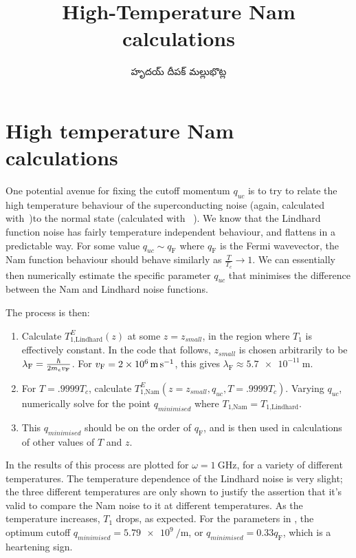 \documentclass[../main.tex]{subfiles}
\title{High-Temperature Nam calculations}
\author{\begin{telugu}హృదయ్ దీపక్ మల్లుభొట్ల\end{telugu}}
\date{}
\begin{document}
	\graphicspath{{\main/figures/}}

	\onlyinsubfile{\maketitle}

	\section{High temperature Nam calculations} \label{sec:htn:intro}

	One potential avenue for fixing the cutoff momentum $q_{uc}$ is to try to relate the high temperature behaviour of the superconducting noise (again, calculated with~\cite{Nam1967})to the normal state (calculated with ~\cite{SolyomV3}).
	We know that the Lindhard function noise has fairly temperature independent behaviour, and flattens in a predictable way.
	For some value $q_{uc} \sim q_{\textrm{F}}$ where $q_{\textrm{F}}$ is the Fermi wavevector, the Nam function behaviour should behave similarly as $\frac{T}{T_c} \rightarrow 1$.
	We can essentially then numerically estimate the specific parameter $q_{uc}$ that minimises the difference between the Nam and Lindhard noise functions.

	The process is then:
	\begin{enumerate}
		\item Calculate $T_{1\textrm{,Lindhard}}^{E}(z)$ at some $z = z_{small}$, in the region where $T_1$ is effectively constant.
			In the code that follows, $z_{small}$ is chosen arbitrarily to be $\lambda_{\textrm{F}} = \frac{\hbar}{2 m_e v_{\mathrm{F}}}$.
			For $\vf = \SI{2e6}{\m\per\s}$, this gives $\lambda_{\textrm{F}} \approx \SI{5.7e-11}{\m}$.
		\item For $T = .9999 T_c$, calculate $T_{1\textrm{,Nam}}^{E}(z = z_{small}, q_{uc}, T=.9999 T_c)$.
			Varying $q_{uc}$, numerically solve for the point $q_{minimised}$ where $T_{1\textrm{,Nam}} = T_{1\textrm{,Lindhard}}$.
		\item This $q_{minimised}$ should be on the order of $q_{\textrm{F}}$, and is then used in calculations of other values of $T$ and $z$.
	\end{enumerate}

	In  the results of this process are plotted for $\omega=\SI{1}{\giga\Hz}$, for a variety of different temperatures.
	The temperature dependence of the Lindhard noise is very slight;
	the three different temperatures are only shown to justify the assertion that it's valid to compare the Nam noise to it at different temperatures.
	As the temperature increases, $T_1$ drops, as expected.
	For the parameters in , the optimum cutoff $q_{minimised} = \SI{5.79e9}{\per\meter}$, or $q_{minimised}=0.33 q_{\textrm{F}}$, which is a heartening sign.
\end{document}

